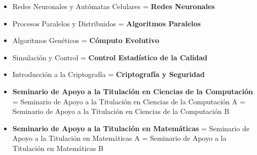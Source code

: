 \begin{itemize}
\item Redes Neuronales y Autómatas Celulares = \textbf{Redes Neuronales}

\item Procesos Paralelos y Distribuidos = \textbf{Algoritmos Paralelos}

\item Algoritmos Genéticos = \textbf{Cómputo Evolutivo}

\item Simulación y Control = \textbf{Control Estadístico de la Calidad}

\item Introducción a la Criptografía = \textbf{Criptografía y Seguridad}

\item \textbf{Seminario de Apoyo a la Titulación en Ciencias de la Computación} = Seminario de Apoyo a la Titulación en Ciencias de la Computación A = Seminario de Apoyo a la Titulación en Ciencias de la Computación B 

\item \textbf{Seminario de Apoyo a la Titulación en Matemáticas} = Seminario de Apoyo a la Titulación en Matemáticas A = Seminario de Apoyo a la Titulación en Matemáticas B
\end{itemize}%
